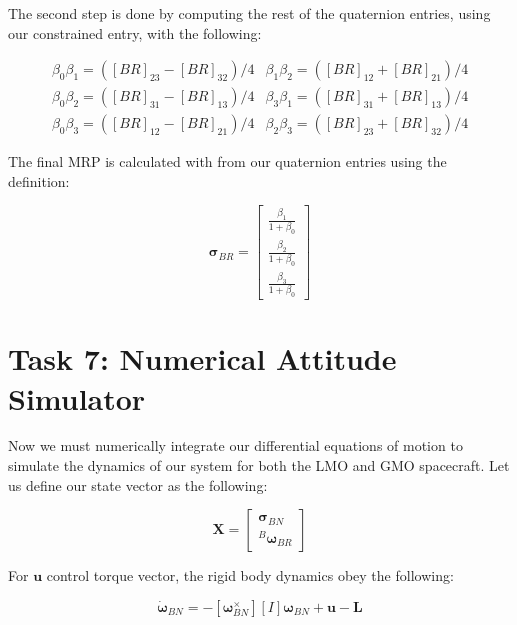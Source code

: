 \documentclass[paper]{aiaaNew}
\begin{document}
The second step is done by computing the rest of the quaternion entries, using our constrained entry, with the following: 

\begin{equation}
  \begin{array}{ll}{\beta_{0} \beta_{1}=\left([BR]_{23}-[BR]_{32}\right) / 4} & {\beta_{1} \beta_{2}=\left([BR]_{12}+[BR]_{21}\right) / 4} \\ {\beta_{0} \beta_{2}=\left([BR]_{31}-[BR]_{13}\right) / 4} & {\beta_{3} \beta_{1}=\left([BR]_{31}+[BR]_{13}\right) / 4} \\ {\beta_{0} \beta_{3}=\left([BR]_{12}-[BR]_{21}\right) / 4} & {\beta_{2} \beta_{3}=\left([BR]_{23}+[BR]_{32}\right) / 4}\end{array}
\end{equation}

The final MRP is calculated with from our quaternion entries using the definition:

\begin{equation}
  \bm{\sigma}_{BR} = \begin{bmatrix}
  \frac{\beta_1}{1+\beta_0} \\
  \frac{\beta_2}{1+\beta_0} \\
  \frac{\beta_3}{1+\beta_0} 
  \end{bmatrix}
\end{equation}






\section*{Task 7: Numerical Attitude Simulator}
Now we must numerically integrate our differential equations of motion to simulate the dynamics of our system for both the LMO and GMO spacecraft. Let us define our state vector as the following: 

\begin{equation}
  \bm{X} = \begin{bmatrix}
  \bm{\sigma}_{BN} \\
  ^B\bm{\omega}_{BR}
  \end{bmatrix}
\end{equation}

For $\bm{u}$ control torque vector, the rigid body dynamics obey the following:

\begin{equation}
  [I]\bm{\dot{\omega}}_{BN} = -[\boldsymbol{\omega}_{BN}^\times][I]\bm{\omega}_{BN} + \bm{u} - \bm{L}
\end{equation}
\end{document}
